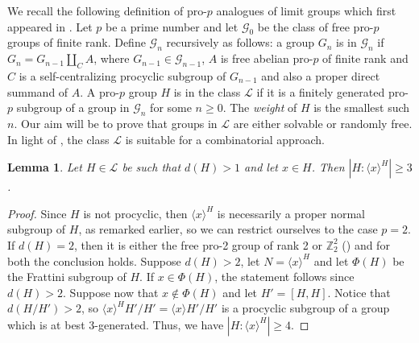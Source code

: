 \documentclass[a4paper,10pt]{amsart}
\theoremstyle{plain}
\newtheorem{lemma}[thm]{Lemma}
\theoremstyle{definition}
\numberwithin{equation}{section}
\begin{document}
We recall the following definition of pro-$p$ analogues of limit groups which first appeared in \cite{KZ}. Let $p$ be a prime number and let $\mathcal G_0$ be the class of free pro-$p$ groups of finite rank. Define $\mathcal G_n$ recursively as follows: a group $G_n$ is in $\mathcal G_n$ if $G_n = G_{n-1} \amalg_C A$, where $G_{n-1} \in \mathcal G_{n-1}$, $A$ is free abelian pro-$p$ of finite rank and $C$ is a self-centralizing procyclic subgroup of $G_{n-1}$ and also a proper direct summand of $A$. A pro-$p$ group $H$ is in the class $\mathcal L$ if it is a finitely generated pro-$p$ subgroup of a group in $\mathcal G_n$ for some $n\geq 0$. The \emph{weight} of $H$ is the smallest such $n$. Our aim will be to prove that groups in $\mathcal L$ are either solvable or randomly free. In light of \cite[Theorem B]{SZ14}, the class $\mathcal L$ is suitable for a combinatorial approach.

\begin{lemma}\label{lem:index_normal_closure}
    Let $H \in \mathcal L$ be such that $d(H) > 1$ and let $x \in H$. Then $|H:\langle x \rangle^H| \geq 3$.
\end{lemma}
\begin{proof}
    Since $H$ is not procyclic, then $\langle x \rangle^H$ is necessarily a proper normal subgroup of $H$, as remarked earlier, so we can restrict ourselves to the case $p=2$. If $d(H)=2$, then it is either the free pro-2 group of rank 2 or $\mathbb Z_2^2$ (\cite[Theorem 7.3]{KZ}) and for both the conclusion holds. Suppose $d(H)>2$, let $N=\langle x \rangle^H$ and let $\Phi(H)$ be the Frattini subgroup of $H$. If $x \in \Phi(H)$, the statement follows since $d(H)>2$. Suppose now that $x \notin \Phi(H)$ and let $H'=[H,H]$. Notice that $d(H/H') > 2$, so $\langle x \rangle^HH'/H' = \langle x \rangle H'/H'$ is a procyclic subgroup of a group which is at best 3-generated. Thus, we have $|H:\langle x \rangle^H| \geq 4$.
\end{proof}
\end{document}
